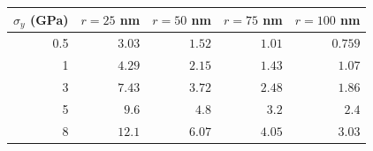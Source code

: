 \begin{tabular}{rrrrr}
\hline
$\sigma_y$ (GPa) & $r=25$ nm & $r=50$ nm & $r=75$ nm & $r=100$ nm \\
\hline
0.5 & $3.03$ & $1.52$ & $1.01$ & $0.759$ \\
1 & $4.29$ & $2.15$ & $1.43$ & $1.07$ \\
3 & $7.43$ & $3.72$ & $2.48$ & $1.86$ \\
5 & $9.6$ & $4.8$ & $3.2$ & $2.4$ \\
8 & $12.1$ & $6.07$ & $4.05$ & $3.03$ \\
\hline
\end{tabular}
